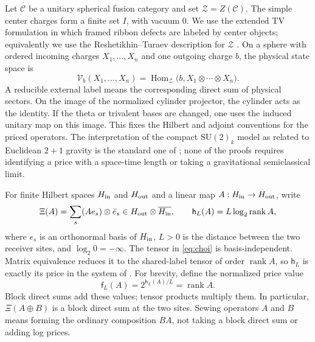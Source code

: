 \documentclass[11pt]{article}
\numberwithin{equation}{section}
\theoremstyle{definition}
\theoremstyle{remark}
\DeclareMathOperator{\Hom}{Hom}
\DeclareMathOperator{\rank}{rank}
\newcommand{\Cat}{\mathcal C}
\newcommand{\Center}{\mathcal Z}
\newcommand{\State}{\mathcal V}
\newcommand{\su}{\mathrm{SU}(2)_k}
\begin{document}
Let \(\Cat\) be a unitary spherical fusion category and set \(\Center=Z(\Cat)\). The simple center charges form a finite set \(I\), with vacuum \(0\). We use the extended TV formulation in which framed ribbon defects are labeled by center objects; equivalently we use the Reshetikhin--Turaev description for \(\Center\) \cite{BalsamKirillov,BalsamII,BalsamIII,MugerDouble}. On a sphere with ordered incoming charges \(X_1,\ldots,X_n\) and one outgoing charge \(b\), the physical state space is
\begin{equation}\label{eq:physical}
  \State_b(X_1,\ldots,X_n)
  =\Hom_{\Center}\bigl(b,X_1\otimes\cdots\otimes X_n\bigr).
\end{equation}
A reducible external label means the corresponding direct sum of physical sectors. On the image of the normalized cylinder projector, the cylinder acts as the identity. If the theta or trivalent bases are changed, one uses the induced unitary map on this image. This fixes the Hilbert and adjoint conventions for the priced operators. The interpretation of the compact \(\su\) model as related to Euclidean \(2+1\) gravity is the standard one of \cite{MizoguchiTada}; none of the proofs requires identifying a price with a space-time length or taking a gravitational semiclassical limit.

For finite Hilbert spaces \(H_{\rm in}\) and \(H_{\rm out}\) and a linear map \(A:H_{\rm in}\to H_{\rm out}\), write
\begin{equation}\label{eq:choi}
 \Xi(A)=\sum_s (Ae_s)\otimes\bar e_s
       \in H_{\rm out}\otimes\overline{H_{\rm in}},
 \qquad
 \mathsf h_L(A)=L\log_2\rank A ,
\end{equation}
where \(e_s\) is an orthonormal basis of \(H_{\rm in}\), \(L>0\) is the distance between the two receiver sites, and \(\log_2 0=-\infty\). The tensor in \eqref{eq:choi} is basis-independent. Matrix equivalence reduces it to the shared-label tensor of order \(\rank A\), so \(\mathsf h_L\) is exactly its price in the system of \cite[Thm.~1.1]{OpenAIPrice}. For brevity, define the normalized price value
\begin{equation}\label{eq:normalized}
     \mathsf f_L(A)=2^{\mathsf h_L(A)/L}=\rank A .
\end{equation}
Block direct sums add these values; tensor products multiply them. In particular, \(\Xi(A\oplus B)\) is a block direct sum at the two sites. Sewing operators \(A\) and \(B\) means forming the ordinary composition \(BA\), not taking a block direct sum or adding log prices.
\end{document}
